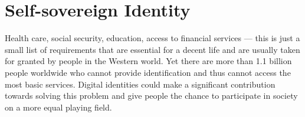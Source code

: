 
\chapter{Self-sovereign Identity}\label{chapter: ssi}

Health care, social security, education, access to financial services — this is just a small list of requirements that are essential for a decent life and are usually taken for granted by people in the Western world. Yet there are more than 1.1 billion people worldwide who cannot provide identification and thus cannot access the most basic services. Digital identities could make a significant contribution towards solving this problem and give people the chance to participate in society on a more equal playing field. \cite{world_bank_11_2017}

